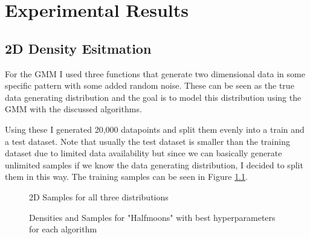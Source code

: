 \chapter{Experimental Results}
\label{cha:experimental_results}

\section{2D Density Esitmation}

For the GMM I used three functions that generate two dimensional data in some specific pattern with some added random noise. These 
can be seen as the true data generating distribution and the goal is to model this distribution using the GMM with the discussed 
algorithms. 

Using these I generated 20,000 datapoints and split them evenly into a train and a test dataset. Note that usually the test dataset is smaller 
than the training dataset due to limited data availability but since we can basically generate unlimited samples if we know 
the data generating distribution, I decided to split them in this way. 
The training samples can be seen in Figure \ref{fig:2d_datasets}.

\begin{figure}[h]
    \centering
    \caption{2D Samples for all three distributions}
    \label{fig:2d_datasets}
\end{figure}



\begin{figure}[h]
    \centering
    \caption{Densities and Samples for "Halfmoons" with best hyperparameters for each algorithm}
    \label{fig:moons_best}
\end{figure}

